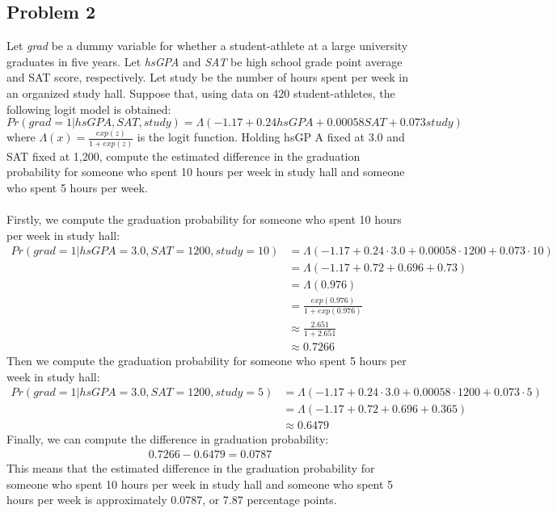 \documentclass[12pt]{article}
\begin{document}
\begin{flushleft}
\subsection*{Problem 2}
Let \textit{grad} be a dummy variable for whether a student-athlete at a large university graduates in five years. Let \textit{hsGPA} and \textit{SAT} be high school grade point average and SAT score, respectively. Let study be the number of hours spent per week in an organized study hall. Suppose that, using data on 420 student-athletes, the following logit model is obtained:
\[
Pr(grad=1|hsGPA, SAT, study) = \Lambda(-1.17 + 0.24hsGPA + 0.00058SAT + 0.073study)
\]
where $\Lambda(x) = \frac{exp(z)}{1+exp(z)}$ is the logit function. Holding hsGP A fixed at 3.0 and SAT fixed at 1,200, compute the estimated difference in the graduation probability for someone who spent 10 hours per week in study hall and someone who spent 5 hours per week.\\~\\
Firstly, we compute the graduation probability for someone who spent 10 hours per week in study hall:
\begin{align*}
Pr(grad=1|hsGPA=3.0, SAT=1200, study=10) &= \Lambda(-1.17 + 0.24 \cdot 3.0 + 0.00058 \cdot 1200 + 0.073 \cdot 10)\\
&= \Lambda(-1.17 + 0.72 + 0.696 + 0.73)\\
&= \Lambda(0.976)\\
&= \frac{exp(0.976)}{1+exp(0.976)}\\
&\approx \frac{2.651}{1+2.651}\\
&\approx 0.7266
\end{align*}
Then we compute the graduation probability for someone who spent 5 hours per week in study hall:
\begin{align*}
Pr(grad=1|hsGPA=3.0, SAT=1200, study=5) &= \Lambda(-1.17 + 0.24 \cdot 3.0 + 0.00058 \cdot 1200 + 0.073 \cdot 5)\\
&= \Lambda(-1.17 + 0.72 + 0.696 + 0.365)\\
& \approx 0.6479
\end{align*}
Finally, we can compute the difference in graduation probability:
\begin{align*}
0.7266 - 0.6479 = 0.0787
\end{align*}
This means that the estimated difference in the graduation probability for someone who spent 10 hours per week in study hall and someone who spent 5 hours per week is approximately 0.0787, or 7.87 percentage points.\\~\\
\end{flushleft}
\end{document}
